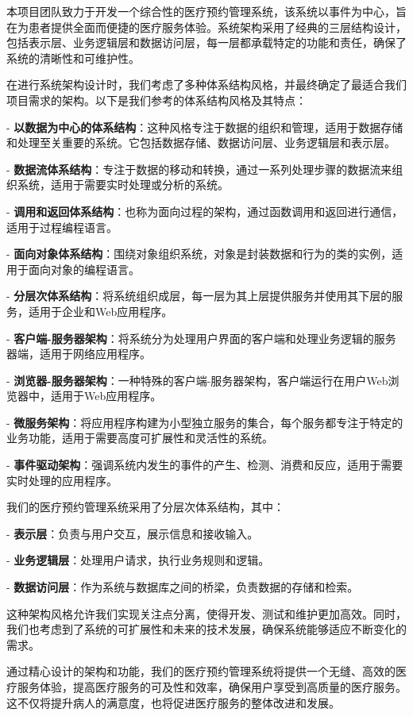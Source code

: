 本项目团队致力于开发一个综合性的医疗预约管理系统，该系统以事件为中心，旨在为患者提供全面而便捷的医疗服务体验。系统架构采用了经典的三层结构设计，包括表示层、业务逻辑层和数据访问层，每一层都承载特定的功能和责任，确保了系统的清晰性和可维护性。

在进行系统架构设计时，我们考虑了多种体系结构风格，并最终确定了最适合我们项目需求的架构。以下是我们参考的体系结构风格及其特点：

- \textbf{以数据为中心的体系结构}：这种风格专注于数据的组织和管理，适用于数据存储和处理至关重要的系统。它包括数据存储、数据访问层、业务逻辑层和表示层。

- \textbf{数据流体系结构}：专注于数据的移动和转换，通过一系列处理步骤的数据流来组织系统，适用于需要实时处理或分析的系统。

- \textbf{调用和返回体系结构}：也称为面向过程的架构，通过函数调用和返回进行通信，适用于过程编程语言。

- \textbf{面向对象体系结构}：围绕对象组织系统，对象是封装数据和行为的类的实例，适用于面向对象的编程语言。

- \textbf{分层次体系结构}：将系统组织成层，每一层为其上层提供服务并使用其下层的服务，适用于企业和Web应用程序。

- \textbf{客户端-服务器架构}：将系统分为处理用户界面的客户端和处理业务逻辑的服务器端，适用于网络应用程序。

- \textbf{浏览器-服务器架构}：一种特殊的客户端-服务器架构，客户端运行在用户Web浏览器中，适用于Web应用程序。

- \textbf{微服务架构}：将应用程序构建为小型独立服务的集合，每个服务都专注于特定的业务功能，适用于需要高度可扩展性和灵活性的系统。

- \textbf{事件驱动架构}：强调系统内发生的事件的产生、检测、消费和反应，适用于需要实时处理的应用程序。

我们的医疗预约管理系统采用了分层次体系结构，其中：

- \textbf{表示层}：负责与用户交互，展示信息和接收输入。

- \textbf{业务逻辑层}：处理用户请求，执行业务规则和逻辑。

- \textbf{数据访问层}：作为系统与数据库之间的桥梁，负责数据的存储和检索。

这种架构风格允许我们实现关注点分离，使得开发、测试和维护更加高效。同时，我们也考虑到了系统的可扩展性和未来的技术发展，确保系统能够适应不断变化的需求。

通过精心设计的架构和功能，我们的医疗预约管理系统将提供一个无缝、高效的医疗服务体验，提高医疗服务的可及性和效率，确保用户享受到高质量的医疗服务。这不仅将提升病人的满意度，也将促进医疗服务的整体改进和发展。


